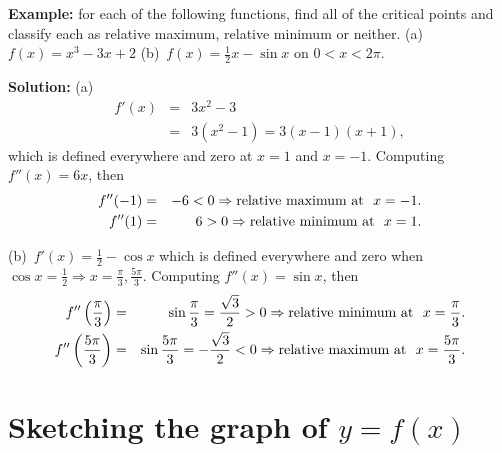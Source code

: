 \documentclass[titlepage,a4paper,12pt]{report}
\begin{document}
\noindent \textbf{Example:} for each of the following functions, find all of the critical points and classify each as relative maximum, relative minimum or neither. (a)\, $f(x)=x^3-3x+2$ \quad (b)\, $f(x)=\frac{1}{2}x-\sin x$ on $0<x<2\pi$.

\noindent \textbf{Solution:} (a)\, 
\begin{eqnarray*}
f'(x) &=& 3x^2-3 \\
&=& 3(x^2-1) =3(x-1)(x+1),
\end{eqnarray*}
which is defined everywhere and zero at $x=1$ and $x=-1$. Computing $f''(x)=6x$, then 
\begin{eqnarray*}
f''(-1) &=& -6<0 \Rightarrow \hbox{relative maximum at}~~x=-1.\\
f''(1) &=& 6>0 \Rightarrow \hbox{relative minimum at}~~ x=1.
\end{eqnarray*}

\noindent (b)\, $f'(x)=\frac{1}{2}-\cos x$ which is defined everywhere and zero when $\cos x =\frac{1}{2}\Rightarrow x=\frac{\pi}{3}, \frac{5\pi}{3}$. Computing $f''(x)=\sin x$, then 
\begin{eqnarray*}
f''\left(\frac{\pi}{3}\right) &=& \sin \frac{\pi}{3} =\frac{\sqrt{3}}{2} >0 \Rightarrow \hbox{relative minimum at}~~x=\frac{\pi}{3}.\\
f''\left(\frac{5\pi}{3}\right) &=& \sin \frac{5\pi}{3} =-\frac{\sqrt{3}}{2} <0 \Rightarrow \hbox{relative maximum at}~~x= \frac{5\pi}{3}.
\end{eqnarray*}

\section{Sketching the graph of $y=f(x)$}
\end{document}
